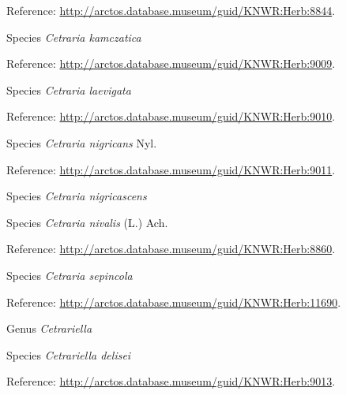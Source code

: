 \documentclass[9pt, article]{memoir}
\begin{document}
\begin{multicols}{2}
\vspace{6pt}Reference: 
\url{http://arctos.database.museum/guid/KNWR:Herb:8844}.

\vspace{6pt}\noindent\hspace{36pt}Species \textit{Cetraria kamczatica}


\vspace{6pt}Reference: 
\url{http://arctos.database.museum/guid/KNWR:Herb:9009}.

\vspace{6pt}\noindent\hspace{36pt}Species \textit{Cetraria laevigata}


\vspace{6pt}Reference: 
\url{http://arctos.database.museum/guid/KNWR:Herb:9010}.

\vspace{6pt}\noindent\hspace{36pt}Species \textit{Cetraria nigricans} Nyl.


\vspace{6pt}Reference: 
\url{http://arctos.database.museum/guid/KNWR:Herb:9011}.

\vspace{6pt}\noindent\hspace{36pt}Species \textit{Cetraria nigricascens}


\vspace{6pt}\noindent\hspace{36pt}Species \textit{Cetraria nivalis} (L.) Ach.


\vspace{6pt}Reference: 
\url{http://arctos.database.museum/guid/KNWR:Herb:8860}.

\vspace{6pt}\noindent\hspace{36pt}Species \textit{Cetraria sepincola}


\vspace{6pt}Reference: 
\url{http://arctos.database.museum/guid/KNWR:Herb:11690}.

\vspace{6pt}\noindent\hspace{30pt}Genus \textit{Cetrariella}


\vspace{6pt}\noindent\hspace{36pt}Species \textit{Cetrariella delisei}


\vspace{6pt}Reference: 
\url{http://arctos.database.museum/guid/KNWR:Herb:9013}.


\end{multicols}
\end{document}
